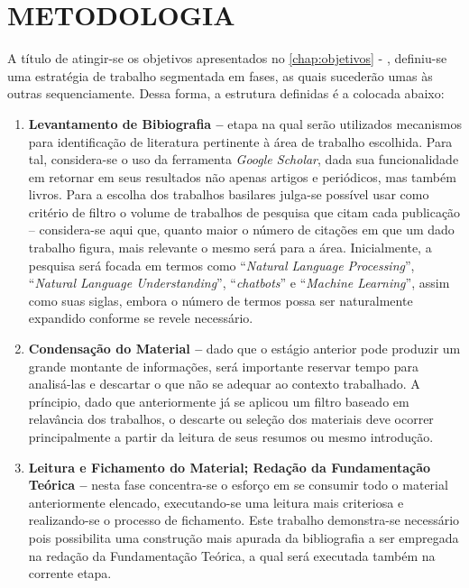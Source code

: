 \chapter{METODOLOGIA}
\label{chap:metodologia}

A título de atingir-se os objetivos apresentados no \chaptername{} \ref*{chap:objetivos} - , definiu-se uma estratégia de trabalho segmentada em fases, as quais sucederão umas às outras sequenciamente. Dessa forma, a estrutura definidas é a colocada abaixo:

\begin{enumerate}
    \item \textbf{Levantamento de Bibiografia --} etapa na qual serão utilizados mecanismos para identificação de literatura pertinente à área de trabalho escolhida. Para tal, considera-se o uso da ferramenta \textit{Google Scholar}, dada sua funcionalidade em retornar em seus resultados não apenas artigos e periódicos, mas também livros. Para a escolha dos trabalhos basilares julga-se possível usar como critério de filtro o volume de trabalhos de pesquisa que citam cada publicação -- considera-se aqui que, quanto maior o número de citações em que um dado trabalho figura, mais relevante o mesmo será para a área. Inicialmente, a pesquisa será focada em termos como ``\textit{Natural Language Processing}'', ``\textit{Natural Language Understanding}'', ``\textit{chatbots}'' e ``\textit{Machine Learning}'', assim como suas siglas, embora o número de termos possa ser naturalmente expandido conforme se revele necessário.
    \item \textbf{Condensação do Material --} dado que o estágio anterior pode produzir um grande montante de informações, será importante reservar tempo para analisá-las e descartar o que não se adequar ao contexto trabalhado. A príncipio, dado que anteriormente já se aplicou um filtro baseado em relavância dos trabalhos, o descarte ou seleção dos materiais deve ocorrer principalmente a partir da leitura de seus resumos ou mesmo introdução.
    \item \textbf{Leitura e Fichamento do Material; Redação da Fundamentação Teórica --} nesta fase concentra-se o esforço em se consumir todo o material anteriormente elencado, executando-se uma leitura mais criteriosa e realizando-se o processo de fichamento. Este trabalho demonstra-se necessário pois possibilita uma construção mais apurada da bibliografia a ser empregada na redação da Fundamentação Teórica, a qual será executada também na corrente etapa.

\end{enumerate}
